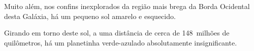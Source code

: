 \documentclass{article}
\begin{document}
  Muito além, nos confins inexplorados da região mais brega da
  Borda Ocidental desta Galáxia, há um pequeno sol amarelo e esquecido.

  Girando em torno deste sol, a uma distância de cerca de 148~milhões de
  quilômetros, há um planetinha verde-azulado absolutamente insignificante.
\end{document}
